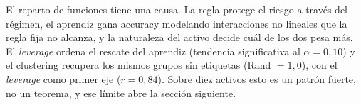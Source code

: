 El reparto de funciones tiene una causa. La regla protege el riesgo a través del régimen, el aprendiz gana accuracy modelando interacciones no lineales que la regla fija no alcanza, y la naturaleza del activo decide cuál de los dos pesa más. El \emph{leverage} ordena el rescate del aprendiz (tendencia significativa al $\alpha = 0{,}10$) y el clustering recupera los mismos grupos sin etiquetas (Rand $= 1{,}0$), con el \emph{leverage} como primer eje ($r = 0{,}84$). Sobre diez activos esto es un patrón fuerte, no un teorema, y ese límite abre la sección siguiente.
